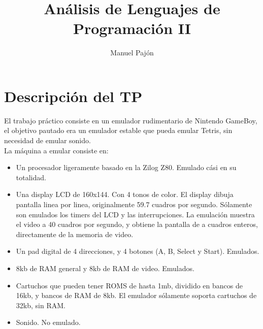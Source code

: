 \documentclass[a4paper,10pt]{report}
\title{
Análisis de Lenguajes de Programación II
}
\author{Manuel Pajón}
\begin{document}
\maketitle
\section*{Descripción del TP}
El trabajo práctico consiste en un emulador rudimentario de Nintendo GameBoy, el objetivo pautado era un emulador estable que pueda emular Tetris, sin necesidad de emular sonido.\\


La máquina a emular consiste en:
\begin{itemize}
  \item Un procesador ligeramente basado en la Zilog Z80. Emulado cási en su totalidad.
  \item Una display LCD de 160x144. Con 4 tonos de color. El display dibuja pantalla linea por linea, originalmente 59.7 cuadros por segundo.
  Sólamente son emulados los timers del LCD y las interrupciones. La emulación muestra el video a 40 cuadros por segundo, y obtiene la pantalla de a cuadros enteros, directamente de la memoria de video.
  \item Un pad digital de 4 direcciones, y 4 botones (A, B, Select y Start). Emulados.
  \item 8kb de RAM general y 8kb de RAM de video. Emulados.
  \item Cartuchos que pueden tener ROMS de hasta 1mb, dividido en bancos de 16kb, y bancos de RAM de 8kb. El emulador sólamente soporta cartuchos de 32kb, sin RAM.
  \item Sonido. No emulado.
  
\end{itemize}
\end{document}
